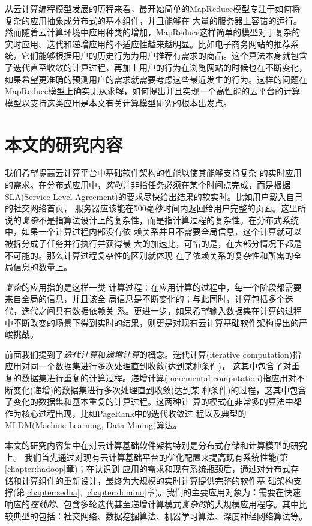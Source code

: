 从云计算编程模型发展的历程来看，最开始简单的MapReduce模型专注于如何将复杂的应用抽象成分布式的基本组件，并且能够在
大量的服务器上容错的运行。然而随着云计算环境中应用种类的增加，MapReduce这样简单的模型对于复杂的实时应用、迭代和递增应用的不适应性越来越明显。比如电子商务网站的推荐系统，它们能够根据用户的历史行为为用户推荐有需求的商品。这个算法本身就包含了迭代直至收敛的计算过程，再加上用户的行为在浏览网站的时候也在不断变化，如果希望更准确的预测用户的需求就需要考虑这些最近发生的行为。这样的问题在MapReduce模型上确实无从求解，如何提出并且实现一个高性能的云平台的计算模型以支持这类应用是本文有关计算模型研究的根本出发点。

\section{本文的研究内容}

我们希望提高云计算平台中基础软件架构的性能以使其能够支持复杂
的实时应用的需求。在分布式应用中，\textit{实时}并非指任务必须在某个时间点完成，而是根据
SLA(Service-Level Agreement)的要求尽快给出结果的软实时。比如用户载入自己的社交网络首页，
服务器应该能在500毫秒时间内返回给用户完整的页面。这里所说的\textit{复杂}不是指算法设计上的复杂性，而是指计算过程的复杂性。在分布式系统中，如果一个计算过程内部没有依
赖关系并且不需要全局信息，这个计算就可以被拆分成子任务并行执行并获得最
大的加速比，可惜的是，在大部分情况下都是不可能的。那么计算过程复杂性的区别就体现
在了依赖关系的复杂性和所需的全局信息的数量上。

\textit{复杂}的应用指的是这样一类
计算过程：在应用计算的过程中，每一个阶段都需要来自全局的信息，并且该全
局信息是不断变化的；与此同时，计算包括多个迭代，迭代之间具有数据依赖关
系。更进一步，如果希望输入数据集在计算的过程中不断改变的场景下得到实时的结果，则更是对现有云计算基础软件架构提出的严峻挑战。

前面我们提到了\textit{迭代计算}和\textit{递增计算}的概念。迭代计算(iterative
computation)指应用对同一个数据集进行多次处理直到收敛(达到某种条件)，
这其中包含了对重复的数据集进行重复的计算过程。递增计算(incremental
computation)指应用对不断变化(递增)的数据集进行多次处理直到收敛(达到某
种条件)的过程，这其中包含了变化的数据集和基本重复的计算过程。这两种计
算的模式在非常多的算法中都作为核心过程出现，比如PageRank\cite{page1999pagerank}中的迭代收敛过
程以及典型的MLDM(Machine Learning, Data Mining)算法。

本文的研究内容集中在对云计算基础软件架构特别是分布式存储和计算模型的研究上。
我们首先通过对现有云计算基础平台的优化配置来提高现有系统性能(第\ref{chapter:hadoop}章)；在认识到
应用的需求和现有系统瓶颈后，通过对分布式存储和计算组件的重新设计，最终为大规模的实时计算提供完整的软件基
础架构支撑(第\ref{chapter:sedna}, \ref{chapter:domino}章)。我们的主要应用对象为：需要在快速响应的\textit{在线的}、包含多轮迭代甚至递增计算模式\textit{复杂的}的大规模应用程序。其中比较典型的包括：社交网络、数据挖掘算法、机器学习算法、深度神经网络算法等。

